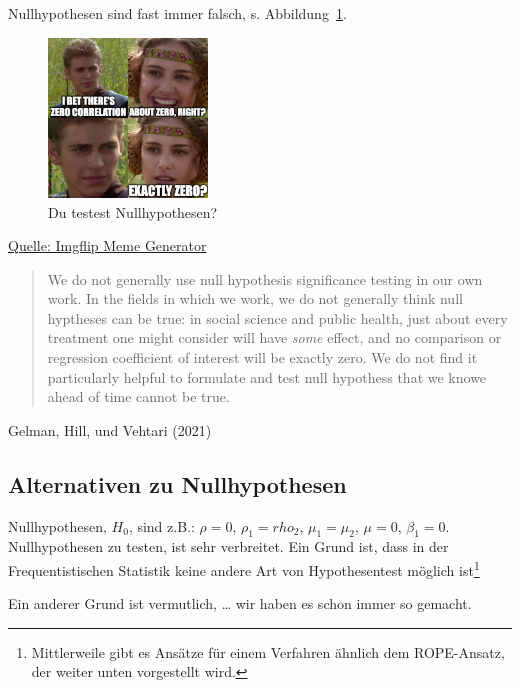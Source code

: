 \documentclass[
  a4paper,
  DIV=11]{scrreprt}
\theoremstyle{definition}
\theoremstyle{remark}
\begin{document}
Nullhypothesen sind fast immer falsch, s. Abbildung~\ref{fig-nullmeme}.

\begin{figure}

{\centering \includegraphics[width=1.67in,height=\textheight]{./img/5v5531.jpg}

}

\caption{\label{fig-nullmeme}Du testest Nullhypothesen?}

\end{figure}

\href{https://imgflip.com/i/5v5531}{Quelle: Imgflip Meme Generator}

\begin{quote}
We do not generally use null hypothesis significance testing in our own
work. In the fields in which we work, we do not generally think null
hyptheses can be true: in social science and public health, just about
every treatment one might consider will have \emph{some} effect, and no
comparison or regression coefficient of interest will be exactly zero.
We do not find it particularly helpful to formulate and test null
hypothess that we knowe ahead of time cannot be true.
\end{quote}

Gelman, Hill, und Vehtari (2021)

\hypertarget{alternativen-zu-nullhypothesen}{%
\subsection{Alternativen zu
Nullhypothesen}\label{alternativen-zu-nullhypothesen}}

Nullhypothesen, \(H_0\), sind z.B.: \(\rho=0\), \(\rho_1 = rho_2\),
\(\mu_1 = \mu_2\), \(\mu=0\), \(\beta_1=0\). Nullhypothesen zu testen,
ist sehr verbreitet. Ein Grund ist, dass in der Frequentistischen
Statistik keine andere Art von Hypothesentest möglich ist\footnote{Mittlerweile
  gibt es Ansätze für einem Verfahren ähnlich dem ROPE-Ansatz, der
  weiter unten vorgestellt wird.}

Ein anderer Grund ist vermutlich, \ldots{} wir haben es schon immer so
gemacht.
\end{document}
